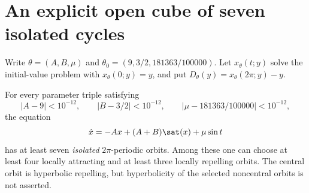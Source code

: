 \section{An explicit open cube of seven isolated cycles}\label{sec:consequences}
Write $\theta=(A,B,\mu)$ and
$\theta_0=(9,3/2,181363/100000)$.
Let $x_\theta(t;y)$ solve the initial-value problem with
$x_\theta(0;y)=y$, and put
$D_\theta(y)=x_\theta(2\pi;y)-y$.

\begin{theorem}
\label{thm:quantitative}
For every parameter triple satisfying
\begin{equation}\label{eq:param-cube}
  |A-9|<10^{-12},\qquad |B-3/2|<10^{-12},\qquad
  |\mu-181363/100000|<10^{-12},
\end{equation}
the equation
\[
  \dot x=-Ax+(A+B)\sat(x)+\mu\sin t
\]
has at least seven \emph{isolated} $2\pi$-periodic orbits.
Among these one can choose at least four locally attracting and
at least three locally repelling orbits. The central orbit is
hyperbolic repelling, but hyperbolicity of the selected noncentral
orbits is not asserted.
\end{theorem}

